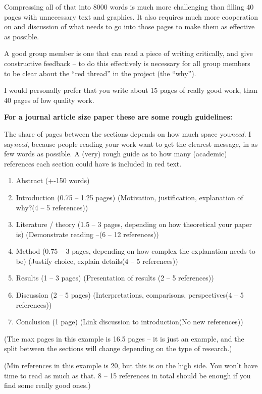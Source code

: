 \documentclass[10pt,twoside]{article}
\begin{document}
Compressing all of that into 8000 words is much more challenging than
filling 40 pages with unnecessary text and graphics. It also requires
much more cooperation on and discussion of what needs to go into those
pages to make them as effective as possible.

A good group member is one that can read a piece of writing critically,
and give constructive feedback -- to do this effectively is necessary
for all group members to be clear about the ``red thread'' in the
project (the ``why'').

I would personally prefer that you write about 15 pages of really good
work, than 40 pages of low quality work.

\textbf{For a journal article size paper these are some rough
guidelines:}

The share of pages between the sections depends on how much space
you\emph{need}. I say\emph{need}, because people reading your work want
to get the clearest message, in as few words as possible. A (very) rough
guide as to how many (academic) references each section could have is
included in red text.

\begin{enumerate}
\def\labelenumi{\arabic{enumi}.}
\item
  Abstract (+-150 words)
\item
  Introduction (0.75 -- 1.25 pages) (Motivation, justification,
  explanation of why?(4 -- 5 references))
\item
  Literature / theory (1.5 -- 3 pages, depending on how theoretical your
  paper is) (Demonstrate reading --(6 -- 12 references))
\item
  Method (0.75 -- 3 pages, depending on how complex the explanation
  needs to be) (Justify choice, explain details(4 -- 5 references))
\item
  Results (1 -- 3 pages) (Presentation of results (2 -- 5 references))
\item
  Discussion (2 -- 5 pages) (Interpretations, comparisons,
  perspectives(4 -- 5 references))
\item
  Conclusion (1 page) (Link discussion to introduction(No new
  references))
\end{enumerate}

(The max pages in this example is 16.5 pages -- it is just an example,
and the split between the sections will change depending on the type of
research.)

(Min references in this example is 20, but this is on the high side. You
won't have time to read as much as that. 8 -- 15 references in total
should be enough if you find some really good ones.)
\end{document}
